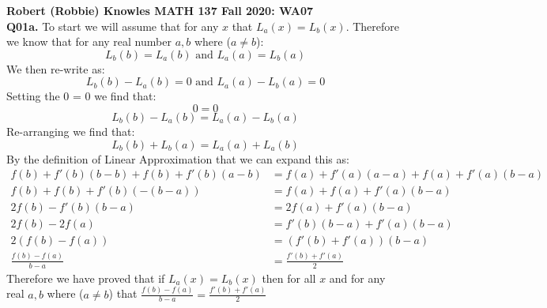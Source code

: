 \documentclass[11pt]{article}
\begin{document}
\parindent=0pt

\textbf{Robert (Robbie) Knowles MATH 137 Fall 2020: WA07}\\

\textbf{Q01a.} To start we will assume that for any $x$ that $L_a(x) = L_b(x)$. Therefore we know that for any real number $a,b$ where ($a \neq b$):
\[ L_b(b) = L_a(b)  \text{  and   } L_a(a) = L_b(a)\] 
We then re-write as:
\[ L_b(b) -  L_a(b) = 0  \text{  and   } L_a(a) - L_b(a) = 0\] 
Setting the 0 = 0 we find that:
\[ 0 = 0 \] 
\[ L_b(b) -  L_a(b) =  L_a(a)  - L_b(a) \] 
Re-arranging we find that:
\[L_b(b)+ L_b(a)  = L_a(a) + L_a(b) \]
By the definition of Linear Approximation that we can expand this as:
\begin{align*}
f(b)+f'(b)(b-b)+f(b)+f'(b)(a-b) & =  f(a)+f'(a)(a-a)+f(a)+f'(a)(b-a)\\
f(b)+f(b)+f'(b)(-(b-a)) & = f(a)+f(a)+f'(a)(b-a)\\
2f(b)-f'(b)(b-a)  &= 2f(a)+ f'(a)(b-a)\\
2f(b) - 2f(a) &= f'(b)(b-a) + f'(a)(b-a)\\
2(f(b) - f(a)) &= (f'(b) + f'(a))(b-a)\\
\frac{f(b)-f(a)}{b-a} &= \frac{f'(b)+f'(a)}{2}
\end{align*}
Therefore we have proved that if $L_a(x) = L_b(x)$ then for all $x$ and for any real $a,b$ where ($a \neq b$) that $\frac{f(b)-f(a)}{b-a} = \frac{f'(b)+f'(a)}{2}$\\\\\\\\\\\\\\\\\\\\\\\\\\
\end{document}
